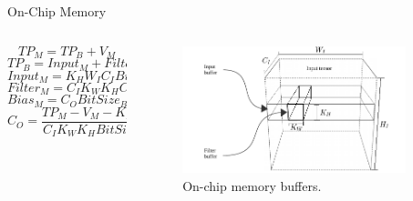 \begin{frame}{On-Chip Memory}
	\begin{columns}[c] %
		\begin{column}{0.5\textwidth}
			\scriptsize
			\vspace{1mm}
			\begin{equation}
			TP_{M}=TP_B+V_{M}
			\end{equation}
			\vspace{1mm} 
			\begin{equation}
			TP_{B}=Input_{M}+Filter_{M}+Bias_{M}
			\end{equation}
			\vspace{1mm} 
			\begin{equation}
			Input_{M}=K_{H}W_{I}C_{I}BitSize_{I}
			\end{equation}
			\vspace{1mm} 
			\begin{equation}
			Filter_{M}=C_{I}K_{W}K_{H}C_{O}BitSize_{F}
			\end{equation}
			\vspace{1mm} 
			\begin{equation}
			Bias_{M}=C_{O}BitSize_{B}
			\end{equation}
			\vspace{1mm} 
			\begin{equation}
			C_{O}=\frac{TP_{M}-V_{M}-K_{H}W_{I}C_{I}BitSize_{I}}{C_{I}K_{W}K_{H}BitSize_{F}+BitSize_{B}}
			\end{equation}
		\end{column}
		
		\begin{column}{0.5\textwidth}
			\begin{figure}
				\centering
				\includegraphics[width=0.9\textwidth]{../chapters/cnn_accelerator/figures/accelerator_buffers.pdf} %
				\caption{\scriptsize On-chip memory buffers.}
			\end{figure}
		\end{column}
	\end{columns}
\end{frame}


